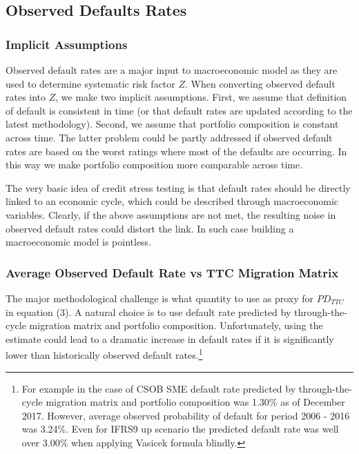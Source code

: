 \documentclass[a4paper]{article}
\begin{document}
\subsection{Observed Defaults Rates}

\subsubsection{Implicit Assumptions}

Observed default rates are a major input to macroeconomic model as they are used to determine systematic risk factor $Z$. When converting observed default rates into $Z$, we make two implicit assumptions. First, we assume that definition of default is consistent in time (or that default rates are updated according to the latest methodology). Second, we assume that portfolio composition is constant across time. The latter problem could be partly addressed if observed default rates are based on the worst ratings where most of the defaults are occurring. In this way we make portfolio composition more comparable across time.

The very basic idea of credit stress testing is that default rates should be directly linked to an economic cycle, which could be described through macroeconomic variables. Clearly, if the above assumptions are not met, the resulting noise in observed default rates could distort the link. In such case building a macroeconomic model is pointless.

\subsubsection{Average Observed Default Rate vs TTC Migration Matrix}

The major methodological challenge is what quantity to use as proxy for $PD_{TTC}$ in equation (3). A natural choice is to use default rate predicted by through-the-cycle migration matrix and portfolio composition. Unfortunately, using the estimate could lead to a dramatic increase in default rates if it is significantly lower than historically observed default rates.\footnote{For example in the case of CSOB SME default rate predicted by through-the-cycle migration matrix and portfolio composition was 1.30\% as of December 2017. However, average observed probability of default for period 2006 - 2016 was 3.24\%. Even for IFRS9 up scenario the predicted default rate was well over 3.00\% when applying Vasicek formula blindly.}
\end{document}
